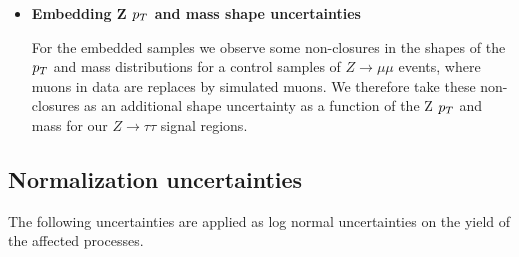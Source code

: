 \begin{itemize}
\item \textbf{Embedding Z $p_{T}$ and mass shape uncertainties}

For the embedded samples we observe some non-closures in the shapes of the $p_{T}$ and mass distributions for a control samples of $Z\to\mu\mu$ events, where muons in data are replaces by simulated muons. We therefore take these non-closures as an additional shape uncertainty as a function of the Z $p_{T}$ and mass for our $Z\to\tau\tau$ signal regions.

\end{itemize}

\subsection{Normalization uncertainties}
The following uncertainties are applied as log normal uncertainties on the yield of the affected processes.

